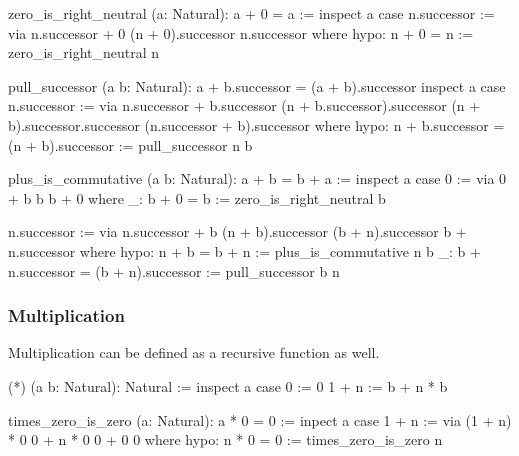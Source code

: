 \begin{alba}
  zero_is_right_neutral (a: Natural): a + 0 = a :=
    inspect a case
      n.successor :=
        via
          n.successor + 0
          (n + 0).successor
          n.successor
        where
          hypo: n + 0 = n := zero_is_right_neutral n
\end{alba}

\begin{alba}
  pull_successor (a b: Natural): a + b.successor = (a + b).successor
    inspect a case
       n.successor :=
         via n.successor + b.successor
             (n + b.successor).successor
             (n + b).successor.successor
             (n.successor + b).successor
         where
           hypo: n + b.successor = (n + b).successor :=
             pull_successor n b
\end{alba}


\begin{alba}
   plus_is_commutative (a b: Natural): a + b = b + a :=
     inspect a case
       0 :=
         via 0 + b
             b
             b + 0
         where
           _: b + 0 = b := zero_is_right_neutral b

       n.successor :=
         via
           n.successor + b
           (n + b).successor
           (b + n).successor
           b + n.successor
         where
           hypo: n + b = b + n := plus_is_commutative n b
           _: b + n.successor = (b + n).successor := pull_successor b n
\end{alba}





\subsubsection{Multiplication}



Multiplication can be defined as a recursive function as well.

\begin{alba}
  (*) (a b: Natural): Natural :=
    inspect a case
      0 :=
        0
      1 + n :=
        b + n * b
\end{alba}

\begin{alba}
  times_zero_is_zero (a: Natural): a * 0 = 0 :=
    inpect a case
      1 + n :=
       via (1 + n) * 0
           0 + n * 0
           0 + 0
           0
       where
         hypo: n * 0 = 0 := times_zero_is_zero n
\end{alba}

